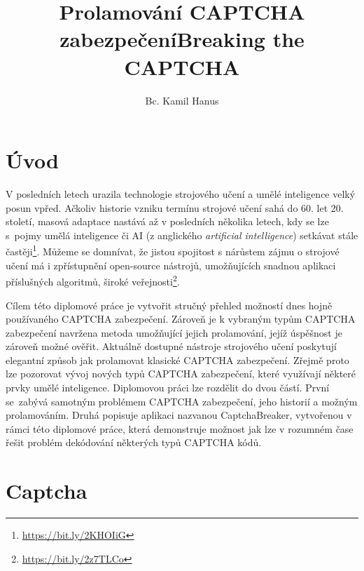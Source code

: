 \documentclass[
  field=ainfp,
  master=true,
  biblatex,
  sourcecodes=false,
  theorems=false,
  glossaries,
  index
]{kidiplom}
\title{Prolamování CAPTCHA zabezpečení}
\title[english]{Breaking the CAPTCHA}
\author{Bc. Kamil Hanus}
\begin{document}
\maketitle



\newcommand{\BibLaTeX}{\textsc{Bib}\LaTeX}
\renewcommand\UrlFont{}



\section{Úvod}
V posledních letech urazila technologie strojového učení a umělé inteligence velký posun vpřed. Ačkoliv historie vzniku termínu strojové učení sahá do  60. let 20. století, masová adaptace nastává až v posledních několika letech, kdy se lze s~pojmy umělá inteligence či AI (z anglického \textit{artificial intelligence}) setkávat stále častěji\footnote{\url{https://bit.ly/2KHOIiG}}. Můžeme se domnívat, že jistou spojitost s nárůstem zájmu o strojové učení má i zpřístupnění open-source nástrojů, umožňujících snadnou aplikaci příslušných algoritmů, široké veřejnosti\footnote{\url{https://bit.ly/2z7TLCo}}.

Cílem této diplomové práce je vytvořit stručný přehled možností dnes hoj\-ně používaného CAPTCHA zabezpečení. Zároveň je k vybraným typům CAPTCHA zabezpečení navržena metoda umožňující jejich prolamování, jejíž úspěšnost je zároveň možné ověřit.  Aktuálně dostupné nástroje strojového učení poskytují elegantní způsob jak prolamovat klasické CAPTCHA zabezpečení. Zřejmě proto lze pozorovat vývoj nových typů CAPTCHA zabezpečení, které využívají ně\-kte\-ré prvky umělé inteligence. Diplomovou práci lze rozdělit do dvou částí. První se~zabývá samotným problémem CAPTCHA zabezpečení, jeho historií a možným prolamováním. Druhá popisuje aplikaci nazvanou CaptchaBreaker, vytvořenou v rámci této diplomové práce, která demonstruje možnost jak lze v rozumném čase řešit problém dekódování některých typů CAPTCHA kódů.
\newpage
\section{Captcha}
\end{document}
